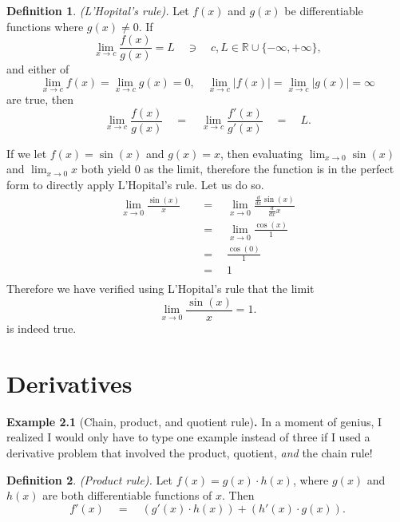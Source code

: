 \documentclass{article}
\theoremstyle{definition}
\newtheorem{definition}{Definition}
\begin{document}
\begin{definition}{\textit{(L'Hopital's rule).}}
    Let $f(x)$ and $g(x)$ be differentiable functions where $g(x)\neq0$. If
\begin{equation*}
    \lim_{x \to c} \frac{f(x)}{g(x)} = L \quad\ni\quad c, L \in \mathbb{R}\cup\{-\infty,+\infty\},
\end{equation*}
and either of
\begin{equation*}
    \lim_{x \to c} f(x)=\lim_{x \to c} g(x)=0,\quad\lim_{x \to c} |f(x)|=\lim_{x \to c} |g(x)|=\infty
\end{equation*}
are true, then
\begin{equation*}
    \lim_{x \to c} \frac{f(x)}{g(x)}\quad=\quad\lim_{x \to c} \frac{f'(x)}{g'(x)}\quad=\quad L.
\end{equation*}
\end{definition}

If we let $f(x)=\sin(x)$ and $g(x)=x$, then evaluating $\lim_{x \to 0} \sin(x)$ and $\lim_{x \to 0} x$
both yield $0$ as the limit, therefore the function is in the perfect form to directly apply L'Hopital's rule.
Let us do so.
\begin{equation*}
\begin{split}
    \lim_{x \to 0} \frac{\sin(x)}{x}\quad&=\quad\lim_{x \to 0} \frac{\frac{d}{dx}\sin(x)}{\frac{d}{dx}x}\\
    &=\quad\lim_{x \to 0} \frac{\cos(x)}{1}\\
    &=\quad\frac{\cos(0)}{1}\\
    &=\quad1\\
\end{split}
\end{equation*}
Therefore we have verified using L'Hopital's rule that the limit
\begin{equation*}
    \lim_{x \to 0} \frac{\sin (x)}{x} = 1.
\end{equation*}
is indeed true.

\section{Derivatives}
\noindent\textbf{Example 2.1 }(Chain, product, and quotient rule)\textbf{.}
In a moment of genius, I realized I would only have to type one example instead of three if I used 
a derivative problem that involved the product, quotient, \textit{and} the chain rule!

\begin{definition}{\textit{(Product rule).}}
Let $f(x)=g(x)\cdot h(x)$, where $g(x)$ and $h(x)$ are both differentiable functions of $x$. Then
\begin{equation*}
    f'(x)\quad=\quad (g'(x)\cdot h(x)) + (h'(x)\cdot g(x)).
\end{equation*}
\end{definition}
\end{document}
